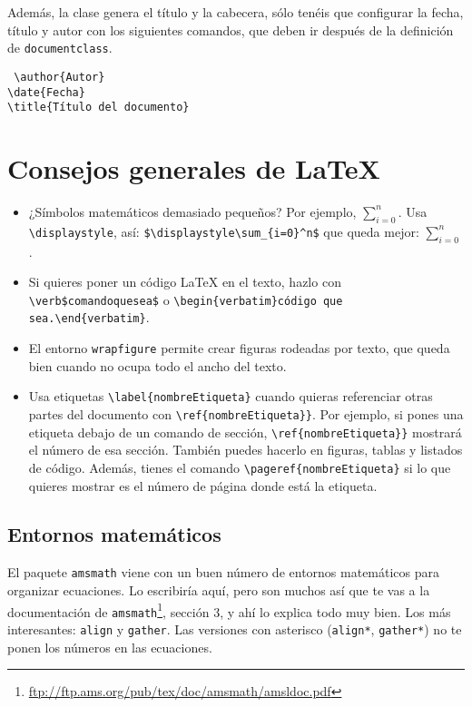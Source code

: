 \documentclass[nochap]{apuntes}
\begin{document}
 Además, la clase genera el título y la cabecera, sólo tenéis que configurar la fecha, título y autor con los siguientes comandos, que deben ir después de la definición de \texttt{documentclass}.
 
 \begin{verbatim}
 \author{Autor}
\date{Fecha}
\title{Título del documento}
 \end{verbatim}
 
\section{Consejos generales de \LaTeX}

\begin{itemize}
\item ¿Símbolos matemáticos demasiado pequeños? Por ejemplo, $\sum_{i=0}^n$. Usa \verb|\displaystyle|, así: \verb|$\displaystyle\sum_{i=0}^n$| que queda mejor: $\displaystyle\sum_{i=0}^n$.
\item Si quieres poner un código LaTeX en el texto, hazlo con \verb|\verb$comandoquesea$| o \verb|\begin{verbatim}código que sea.\end{verbatim}|.
\item El entorno \texttt{wrapfigure} permite crear figuras rodeadas por texto, que queda bien cuando no ocupa  todo el ancho del texto.
\item Usa etiquetas \verb|\label{nombreEtiqueta}| cuando quieras referenciar otras partes del documento con \verb|\ref{nombreEtiqueta}}|. Por ejemplo, si pones una etiqueta debajo de un comando de sección, \verb|\ref{nombreEtiqueta}}| mostrará el número de esa sección. También puedes hacerlo en figuras, tablas y listados de código. Además, tienes el comando \verb|\pageref{nombreEtiqueta}| si lo que quieres mostrar es el número de página donde está la etiqueta.
\end{itemize} 

\subsection{Entornos matemáticos}

El paquete \texttt{amsmath} viene con un buen número de entornos matemáticos para organizar ecuaciones. Lo escribiría aquí, pero son muchos así que te vas a la documentación de \texttt{amsmath}\footnote{\url{ftp://ftp.ams.org/pub/tex/doc/amsmath/amsldoc.pdf}}, sección 3, y ahí lo explica todo muy bien. Los más interesantes: \texttt{align} y \texttt{gather}. Las versiones con asterisco (\texttt{align*}, \texttt{gather*}) no te ponen los números en las ecuaciones. 
\end{document}
